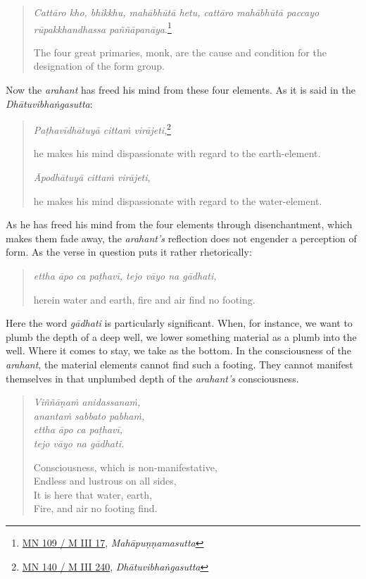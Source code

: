 \begin{quote}
\emph{Cattāro kho, bhikkhu, mahābhūtā hetu, cattāro mahābhūtā paccayo rūpakkhandhassa paññāpanāya}.\footnote{\href{https://suttacentral.net/mn109/pli/ms}{MN 109 / M III 17}, \emph{Mahāpuṇṇamasutta}}

The four great primaries, monk, are the cause and condition for the designation of the form group.
\end{quote}

Now the \emph{arahant} has freed his mind from these four elements. As it is said in the \emph{Dhātuvibhaṅgasutta}:

\clearpage

\begin{quote}
\emph{Paṭhavīdhātuyā cittaṁ virājeti},\footnote{\href{https://suttacentral.net/mn140/pli/ms}{MN 140 / M III 240}, \emph{Dhātuvibhaṅgasutta}}

he makes his mind dispassionate with regard to the earth-element.

\emph{Āpodhātuyā cittaṁ virājeti},

he makes his mind dispassionate with regard to the water-element.
\end{quote}

As he has freed his mind from the four elements through disenchantment, which makes them fade away, the \emph{arahant's} reflection does not engender a perception of form. As the verse in question puts it rather rhetorically:

\begin{quote}
\emph{ettha āpo ca paṭhavī, tejo vāyo na gādhati,}

herein water and earth, fire and air find no footing.
\end{quote}

Here the word \emph{gādhati} is particularly significant. When, for instance, we want to plumb the depth of a deep well, we lower something material as a plumb into the well. Where it comes to stay, we take as the bottom. In the consciousness of the \emph{arahant}, the material elements cannot find such a footing. They cannot manifest themselves in that unplumbed depth of the \emph{arahant's} consciousness.

\begin{quote}
\emph{Viññāṇaṁ anidassanaṁ,}\\
\emph{anantaṁ sabbato pabhaṁ,}\\
\emph{ettha āpo ca paṭhavī,}\\
\emph{tejo vāyo na gādhati.}

Consciousness, which is non-manifestative,\\
Endless and lustrous on all sides,\\
It is here that water, earth,\\
Fire, and air no footing find.
\end{quote}

